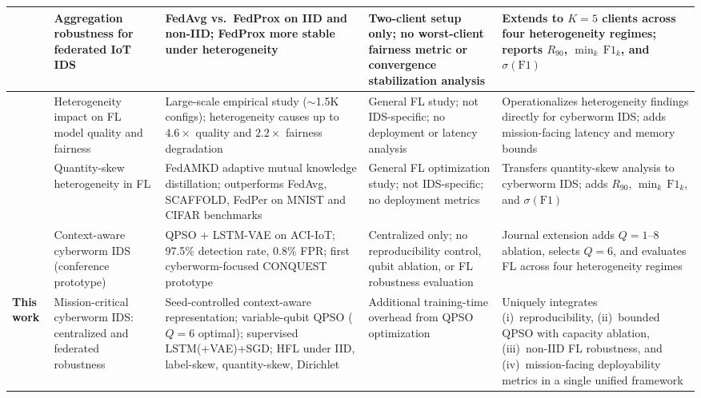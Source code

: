 \documentclass[conference]{IEEEtran}
\begin{document}
\begin{table}[!htbp]
{\begin{tabular}{p{1.4cm} p{2.8cm} p{4.2cm} p{2.8cm} p{4.2cm}}
\cite{herlambangfederated} &
Aggregation robustness for federated IoT IDS &
FedAvg vs.\ FedProx on IID and non-IID;
FedProx more stable under heterogeneity &
Two-client setup only; no worst-client
fairness metric or convergence stabilization
analysis &
Extends to $K{=}5$ clients across four
heterogeneity regimes; reports $R_{90}$,
$\min_k\,\mathrm{F1}_k$, and
$\sigma(\mathrm{F1})$ \\
\midrule

\cite{abdelmoniemcomprehensive} &
Heterogeneity impact on FL model quality
and fairness &
Large-scale empirical study (${\sim}$1.5K
configs); heterogeneity causes up to $4.6\times$
quality and $2.2\times$ fairness degradation &
General FL study; not IDS-specific; no
deployment or latency analysis &
Operationalizes heterogeneity findings
directly for cyberworm IDS; adds
mission-facing latency and memory bounds \\
\midrule

\cite{gefedamkd} &
Quantity-skew heterogeneity in FL &
FedAMKD adaptive mutual knowledge distillation;
outperforms FedAvg, SCAFFOLD, FedPer on
MNIST and CIFAR benchmarks &
General FL optimization study; not
IDS-specific; no deployment metrics &
Transfers quantity-skew analysis to
cyberworm IDS; adds $R_{90}$,
$\min_k\,\mathrm{F1}_k$, and
$\sigma(\mathrm{F1})$ \\
\midrule

\cite{ajakweconquest} &
Context-aware cyberworm IDS (conference
prototype) &
QPSO + LSTM-VAE on ACI-IoT; 97.5\%
detection rate, 0.8\% FPR; first
cyberworm-focused CONQUEST prototype &
Centralized only; no reproducibility
control, qubit ablation, or FL robustness
evaluation &
Journal extension adds $Q{=}1$--$8$ ablation,
selects $Q{=}6$, and evaluates FL across
four heterogeneity regimes \\
\midrule

\textbf{This work} &
Mission-critical cyberworm IDS: centralized
and federated robustness &
Seed-controlled context-aware representation;
variable-qubit QPSO ($Q{=}6$ optimal);
supervised LSTM(+VAE)+SGD; HFL under IID,
label-skew, quantity-skew, Dirichlet &
Additional training-time overhead from
QPSO optimization &
Uniquely integrates (i)~reproducibility,
(ii)~bounded QPSO with capacity ablation,
(iii)~non-IID FL robustness, and
(iv)~mission-facing deployability metrics
in a single unified framework \\

\hline\toprule
\end{tabular}}
\end{table}
\end{document}
